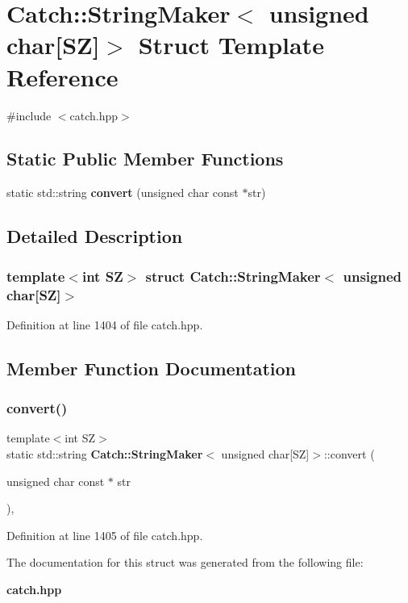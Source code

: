 \section{Catch\+::String\+Maker$<$ unsigned char[SZ]$>$ Struct Template Reference}
\label{struct_catch_1_1_string_maker_3_01unsigned_01char[_s_z]_4}


{\ttfamily \#include $<$catch.\+hpp$>$}

\subsection*{Static Public Member Functions}
\begin{DoxyCompactItemize}
\item 
static std\+::string \textbf{ convert} (unsigned char const $\ast$str)
\end{DoxyCompactItemize}


\subsection{Detailed Description}
\subsubsection*{template$<$int SZ$>$\newline
struct Catch\+::\+String\+Maker$<$ unsigned char[\+S\+Z]$>$}



Definition at line 1404 of file catch.\+hpp.



\subsection{Member Function Documentation}
\mbox{\label{struct_catch_1_1_string_maker_3_01unsigned_01char[_s_z]_4_a590d64c72b0cc75c113f1eea95d52b66}} 
\subsubsection{convert()}
{\footnotesize\ttfamily template$<$int SZ$>$ \\
static std\+::string \textbf{ Catch\+::\+String\+Maker}$<$ unsigned char[SZ]$>$\+::convert (\begin{DoxyParamCaption}\item[{unsigned char const $\ast$}]{str }\end{DoxyParamCaption})\hspace{0.3cm}{\ttfamily [inline]}, {\ttfamily [static]}}



Definition at line 1405 of file catch.\+hpp.



The documentation for this struct was generated from the following file\+:\begin{DoxyCompactItemize}
\item 
\textbf{ catch.\+hpp}\end{DoxyCompactItemize}
